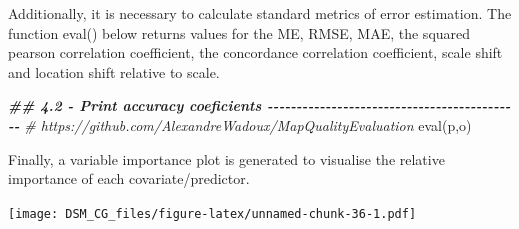 \documentclass[
  10pt,
  b5paper,
  oneside]{book}
\newenvironment{Shaded}{\begin{snugshade}}{\end{snugshade}}
\newcommand{\AttributeTok}[1]{\textcolor[rgb]{0.77,0.63,0.00}{#1}}
\newcommand{\CommentTok}[1]{\textcolor[rgb]{0.56,0.35,0.01}{\textit{#1}}}
\newcommand{\DecValTok}[1]{\textcolor[rgb]{0.00,0.00,0.81}{#1}}
\newcommand{\DocumentationTok}[1]{\textcolor[rgb]{0.56,0.35,0.01}{\textbf{\textit{#1}}}}
\newcommand{\FunctionTok}[1]{\textcolor[rgb]{0.00,0.00,0.00}{#1}}
\newcommand{\NormalTok}[1]{#1}
\newcommand{\OtherTok}[1]{\textcolor[rgb]{0.56,0.35,0.01}{#1}}
\newcommand{\SpecialCharTok}[1]{\textcolor[rgb]{0.00,0.00,0.00}{#1}}
\newcommand{\StringTok}[1]{\textcolor[rgb]{0.31,0.60,0.02}{#1}}
\begin{document}
Additionally, it is necessary to calculate standard metrics of error estimation. The function eval() below returns values for the ME, RMSE, MAE, the squared pearson correlation coefficient, the concordance correlation coefficient, scale shift and location shift relative to scale.

\begin{Shaded}
\begin{Highlighting}[]
\DocumentationTok{\#\# 4.2 {-} Print accuracy coeficients {-}{-}{-}{-}{-}{-}{-}{-}{-}{-}{-}{-}{-}{-}{-}{-}{-}{-}{-}{-}{-}{-}{-}{-}{-}{-}{-}{-}{-}{-}{-}{-}{-}{-}{-}{-}{-}{-}{-}{-}{-}{-}{-}{-}}
\CommentTok{\# https://github.com/AlexandreWadoux/MapQualityEvaluation}
\FunctionTok{eval}\NormalTok{(p,o)}
\end{Highlighting}
\end{Shaded}

Finally, a variable importance plot is generated to visualise the relative importance of each covariate/predictor.

\begin{Shaded}
\end{Shaded}

\texttt{[image: DSM\_CG\_files/figure-latex/unnamed-chunk-36-1.pdf]}
\end{document}
